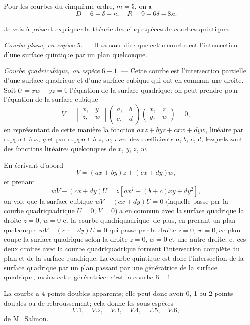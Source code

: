 \documentclass[11pt,a4paper]{article}
\begin{document}
Pour les courbes du cinqui\`{e}me ordre, $m = 5$, on a
\[
D = 6 - \delta - \kappa, \quad R = 9 - 6\delta - 8\kappa.
\]

Je vais \`{a} pr\'{e}sent expliquer la th\'{e}orie des cinq esp\`{e}ces de courbes quintiques.

\medskip
\noindent\textit{Courbe plane, ou esp\`{e}ce $5$.} --- Il va sans dire que cette courbe est l'intersection d'une surface quintique par un plan quelconque.

\medskip
\noindent\textit{Courbe quadricubique, ou esp\`{e}ce $6 - 1$.} --- Cette courbe est l'intersection partielle d'une surface quadrique et d'une surface cubique qui ont en commun une droite. Soit $U = xw - yz = 0$ l'\'{e}quation de la surface quadrique; on peut prendre pour l'\'{e}quation de la surface cubique
\[
V = \begin{vmatrix} x, & y \\ z, & w \end{vmatrix} \begin{pmatrix} a, & b \\ c, & d \end{pmatrix} \begin{pmatrix} x, & z \\ y, & w \end{pmatrix} = 0,
\]
en repr\'{e}sentant de cette mani\`{e}re la fonction $axz + byz + cxw + dyw$, lin\'{e}aire par rapport \`{a} $x$, $y$ et par rapport \`{a} $z$, $w$, avec des coefficients $a$, $b$, $c$, $d$, lesquels sont des fonctions lin\'{e}aires quelconques de $x$, $y$, $z$, $w$.

\clearpage

En \'{e}crivant d'abord
\[
V = (ax + by)z + (cx + dy)w,
\]
et prenant
\[
wV - (cx + dy)U = z[ax^2 + (b+c)xy + dy^2],
\]
on voit que la surface cubique $wV - (cx + dy)U = 0$ (laquelle passe par la courbe quadriquadrique $U = 0$, $V = 0$) a en commun avec la surface quadrique la droite $z = 0$, $w = 0$ et la courbe quadriquadrique; de plus, en prenant un plan quelconque $wV - (cx + dy)U = 0$ qui passe par la droite $z = 0$, $w = 0$, ce plan coupe la surface quadrique selon la droite $z = 0$, $w = 0$ et une autre droite; et ces deux droites avec la courbe quadriquadrique forment l'intersection compl\`{e}te du plan et de la surface quadrique. La courbe quintique est donc l'intersection de la surface quadrique par un plan passant par une g\'{e}n\'{e}ratrice de la surface quadrique, moins cette g\'{e}n\'{e}ratrice: c'est la courbe $6 - 1$.

La courbe a 4 points doubles apparents; elle peut donc avoir 0, 1 ou 2 points doubles ou de rebroussement; cela donne les sous-esp\`{e}ces
\[
V.1, \quad V.2, \quad V.3, \quad V.4, \quad V.5, \quad V.6,
\]
de M.~Salmon.
\end{document}
